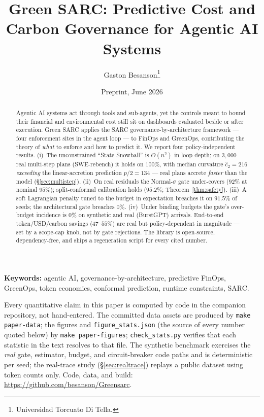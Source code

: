 \documentclass[11pt]{article}
\title{\textbf{Green SARC: Predictive Cost and Carbon Governance for Agentic AI Systems}}
\author{Gaston Besanson\thanks{Universidad Torcuato Di Tella.}}
\date{Preprint, June 2026}
\theoremstyle{plain}
\theoremstyle{definition}
\theoremstyle{remark}
\begin{document}
\maketitle

\begin{abstract}
\noindent Agentic AI systems act through tools and sub-agents, yet the controls meant to bound their financial and environmental cost still sit on dashboards evaluated beside or after execution. Green SARC applies the SARC governance-by-architecture framework --- four enforcement sites in the agent loop --- to FinOps and GreenOps, contributing the theory of \emph{what} to enforce and how to predict it. We report four policy-independent results. (i)~The unconstrained ``State Snowball'' is $\Theta(n^2)$ in loop depth; on $3{,}000$ real multi-step plans (SWE-rebench) it holds on $100\%$, with median curvature $\hat c_2=216$ \emph{exceeding} the linear-accretion prediction $p/2=134$ --- real plans accrete \emph{faster} than the model (\S\ref{sec:multistep}). (ii)~On real residuals the Normal-$\sigma$ gate under-covers ($92\%$ at nominal $95\%$); split-conformal calibration holds ($95.2\%$; Theorem~\ref{thm:safety}). (iii)~A soft Lagrangian penalty tuned to the budget in expectation breaches it on $91.5\%$ of seeds; the architectural gate breaches $0\%$. (iv)~Under binding budgets the gate's over-budget incidence is $0\%$ on synthetic and real (BurstGPT) arrivals. End-to-end token/USD/carbon savings ($47$--$55\%$) are real but policy-dependent in magnitude --- set by a scope-cap knob, not by gate rejections. The library is open-source, dependency-free, and ships a regeneration script for every cited number.
\end{abstract}

\textbf{Keywords:} agentic AI, governance-by-architecture, predictive FinOps, GreenOps, token economics, conformal prediction, runtime constraints, SARC.

\begin{tcolorbox}[colback=linkblue!4,colframe=linkblue!55,title=\textbf{Reproducibility},fonttitle=\bfseries,boxrule=0.5pt]
\small Every quantitative claim in this paper is computed by code in the companion repository, not hand-entered. The committed data assets are produced by \texttt{make paper-data}; the figures and \texttt{figure\_stats.json} (the source of every number quoted below) by \texttt{make paper-figures}; \texttt{check\_stats.py} verifies that each statistic in the text resolves to that file. The synthetic benchmark exercises the \emph{real} gate, estimator, budget, and circuit-breaker code paths and is deterministic per seed; the real-trace study (\S\ref{sec:realtrace}) replays a public dataset using token counts only. Code, data, and build: \url{https://github.com/besanson/Greensarc}.
\end{tcolorbox}
\end{document}
